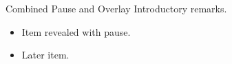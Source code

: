 \documentclass[14pt,t]{beamer-accessibility}
\begin{document}
\begin{frame}{Combined Pause and Overlay}
Introductory remarks.
\pause
\begin{itemize}
\item<2-> Item revealed with pause.
\item<3-> Later item.
\end{itemize}
\end{frame}
\end{document}
